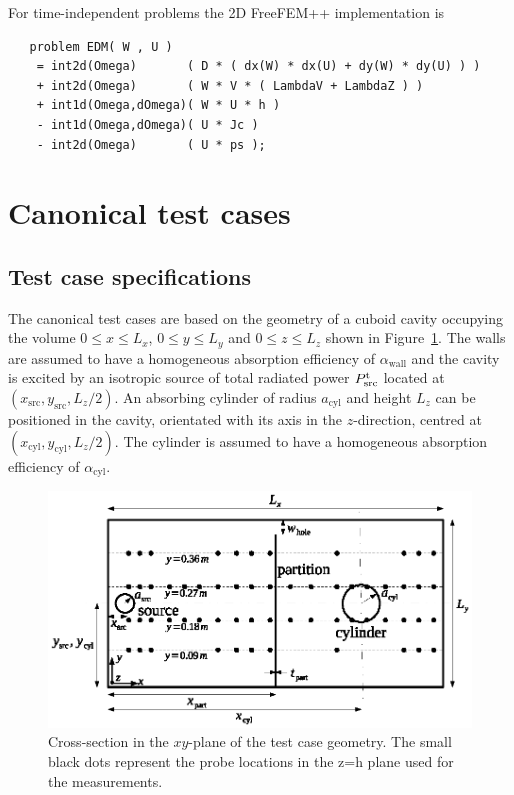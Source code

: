 \documentclass[a4paper]{article}
\numberwithin{equation}{section}
\newcounter{Figure}
\begin{document}
For time-independent problems the 2D FreeFEM++ implementation is 
\begin{verbatim}
   problem EDM( W , U ) 
    = int2d(Omega)       ( D * ( dx(W) * dx(U) + dy(W) * dy(U) ) )
    + int2d(Omega)       ( W * V * ( LambdaV + LambdaZ ) )
    + int1d(Omega,dOmega)( W * U * h )   
    - int1d(Omega,dOmega)( U * Jc )
    - int2d(Omega)       ( U * ps );
\end{verbatim}

\section[Canonical test cases]{Canonical test cases}
\label{sc:tcs}

\subsection[Test case specifications]{Test case specifications}
\label{sc:tcs:spec}

The canonical test cases are based on the geometry of a
cuboid cavity occupying the volume $0 \leq x \leq L_x$, $0 \leq y \leq L_y$ and 
$0 \leq z \leq L_z$ shown in Figure~\ref{fg:tcgeom}. The walls are assumed to have 
a homogeneous absorption efficiency of $\alpha_\mathrm{wall}$ and the cavity is excited
by an isotropic source of total radiated power $P^{\mathrm{t}}_\mathrm{src}$ located at 
$(x_\mathrm{src},y_\mathrm{src},L_z/2)$. An absorbing cylinder of radius $a_\mathrm{cyl}$ 
and height $L_z$ can be positioned in the cavity, orientated with its axis in the
$z$-direction, centred at $(x_\mathrm{cyl},y_\mathrm{cyl},L_z/2)$. The cylinder is assumed
to have a homogeneous absorption efficiency of $\alpha_\mathrm{cyl}$.

\begin{figure}[ht]
\begin{center}
\includegraphics[width=0.8\linewidth]{figures/geometry}
\vspace{-4mm}
\caption{\label{fg:tcgeom} Cross-section in the $xy$-plane of the test case geometry.
The small black dots represent the probe locations in the z=h plane used for the measurements.}
\end{center}
\end{figure}
\end{document}
